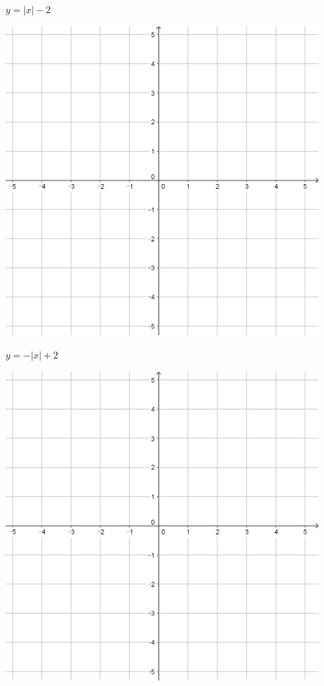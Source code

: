 \documentclass{oblivoir}
\begin{document}
\begin{minipage}{0.45\textwidth}\centering
\(y=|x|-2\)
\par\bigskip\includegraphics[width=0.9\textwidth]{55}
\end{minipage}
\begin{minipage}{0.45\textwidth}\centering
\(y=-|x|+2\)
\par\bigskip\includegraphics[width=0.9\textwidth]{55}
\end{minipage}\bigskip\bigskip\par
\end{document}
